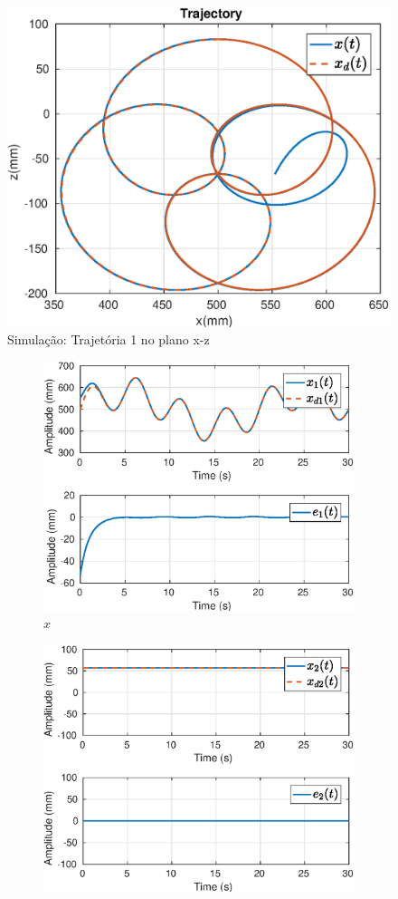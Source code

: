 \begin{figure}[H]
\centering
  \includegraphics[width=0.5\linewidth]{./img/simul_delay_zoh1/traj.eps}
  \caption{Simulação: Trajetória 1 no plano x-z}
  \label{fig:sub1}
\end{figure}%

\begin{figure}[H]
\centering
\begin{subfigure}{.5\textwidth}
  \centering
  \includegraphics[width=\linewidth]{./img/simul_delay_zoh1/x1.eps}
  \caption{$x$}
  \label{fig:sub1}
\end{subfigure}%
\begin{subfigure}{.5\textwidth}
  \centering
  \includegraphics[width=\linewidth]{./img/simul_delay_zoh1/x2.eps}

\end{subfigure}
\end{figure}
